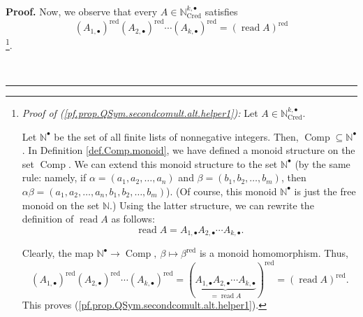 \documentclass
[numbers=enddot,12pt,final,onecolumn,notitlepage,abstracton]{scrartcl}%
\theoremstyle{definition}
\newenvironment{proof}[1][Proof]{\noindent\textbf{#1.} }{\ \rule{0.5em}{0.5em}}
\begin{document}
\begin{proof}
Now, we observe that every $A\in\mathbb{N}_{\operatorname*{Cred}}^{k,\bullet}$
satisfies
\begin{equation}
\left(  A_{1,\bullet}\right)  ^{\operatorname*{red}}\left(  A_{2,\bullet
}\right)  ^{\operatorname*{red}}\cdots\left(  A_{k,\bullet}\right)
^{\operatorname*{red}}=\left(  \operatorname*{read}A\right)
^{\operatorname*{red}} \label{pf.prop.QSym.secondcomult.alt.helper1}%
\end{equation}
\footnote{\textit{Proof of (\ref{pf.prop.QSym.secondcomult.alt.helper1}):} Let
$A\in\mathbb{N}_{\operatorname*{Cred}}^{k,\bullet}$.
\par
Let $\mathbb{N}^{\bullet}$ be the set of all finite lists of nonnegative
integers. Then, $\operatorname*{Comp}\subseteq\mathbb{N}^{\bullet}$. In
Definition \ref{def.Comp.monoid}, we have defined a monoid structure on the
set $\operatorname*{Comp}$. We can extend this monoid structure to the set
$\mathbb{N}^{\bullet}$ (by the same rule: namely, if $\alpha=\left(
a_{1},a_{2},\ldots,a_{n}\right)  $ and $\beta=\left(  b_{1},b_{2},\ldots
,b_{m}\right)  $, then $\alpha\beta=\left(  a_{1},a_{2},\ldots,a_{n}%
,b_{1},b_{2},\ldots,b_{m}\right)  $). (Of course, this monoid $\mathbb{N}%
^{\bullet}$ is just the free monoid on the set $\mathbb{N}$.) Using the latter
structure, we can rewrite the definition of $\operatorname*{read}A$ as
follows:%
\[
\operatorname*{read}A=A_{1,\bullet}A_{2,\bullet}\cdots A_{k,\bullet}.
\]
\par
Clearly, the map $\mathbb{N}^{\bullet}\rightarrow\operatorname*{Comp}%
,\ \beta\mapsto\beta^{\operatorname*{red}}$ is a monoid homomorphism. Thus,%
\[
\left(  A_{1,\bullet}\right)  ^{\operatorname*{red}}\left(  A_{2,\bullet
}\right)  ^{\operatorname*{red}}\cdots\left(  A_{k,\bullet}\right)
^{\operatorname*{red}}=\left(  \underbrace{A_{1,\bullet}A_{2,\bullet}\cdots
A_{k,\bullet}}_{=\operatorname*{read}A}\right)  ^{\operatorname*{red}}=\left(
\operatorname*{read}A\right)  ^{\operatorname*{red}}.
\]
This proves (\ref{pf.prop.QSym.secondcomult.alt.helper1}).}.


\end{proof}
\end{document}
